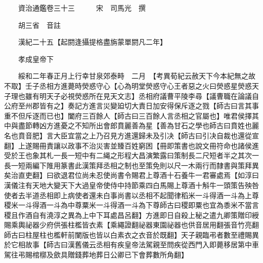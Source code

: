 










 


 
 


 

  
  
  
  
  





  
  
  
  
  
 
  

  

  
  
  



  

 
 

  
   




  

  
  


  　　資治通鑑卷三十三　　　宋　司馬光　撰

　　胡三省　音註

　　漢紀二十五【起閼逢攝提格盡旃蒙單閼凡二年】

　　孝成皇帝下

　　綏和二年春正月上行幸甘泉郊泰畤　二月　【考異荀紀云赦天下今本紀無之故不取】壬子丞相方進薨時熒惑守心【心為明堂熒惑守心王者惡之火曰熒惑星熒惑天子理也雖有明天子必視熒惑所在見天文志】丞相府議曹平陵李尋【議曹職在論議自公府至州郡皆有之】奏記方進言災變廹切大責日加安得保斥逐之戮【師古曰言其事重不但斥逐而已也】闔府三百餘人【師古曰三百餘人言丞相之官屬也】唯君侯擇其中與盡節轉凶方進憂之不知所出會郎賁麗善為星【善為甘石之學也師古曰賁姓也麗名也賁音肥】言大臣宜當之上乃召見方進還歸未及引决【師古曰引决自裁也還從宣翻】上遂賜冊責讓以政事不治災害並臻百姓窮困【冊即策書也說文冊符命也諸侯進受於王也象其札一長一短中有二䋲之形程大昌演繁露曰策制長二尺短者半之其次一長一短兩編下陮用篆書此漢策拜丞相之制也至策免則以尺一木兩行而隸書與策拜異矣治直吏翻】曰欲退君位尚未忍使尚書令賜君上尊酒十石養牛一君審處焉【如淳曰漢儀注有天地大變天下大過皇帝使侍中持節乘四白馬賜上尊酒十斛牛一頭策告殃咎使者去半道丞相即上病使者還未白事尚書以丞相不起聞律稻米一斗得酒一斗為上尊稷米一斗得酒一斗為中尊粟米一斗得酒一斗為下尊師古曰稷即粟也宜為黍米不當言稷且作酒自有澆淳之異為上中下耳處昌呂翻】方進即日自殺上秘之遣九卿策贈印綬賜乘輿祕器少府供張柱檻皆衣素【乘繩證翻祕器東園祕器也供音居用翻張音竹亮翻師古曰柱屋柱也檻軒前闌版也皆以白素衣之衣音於既翻】天子親臨弔者數至禮賜異於它相故事【師古曰漢舊儀云丞相有疾皇帝法駕親至問疾從西門入即薨移居第中車駕往弔賜棺槨及歛具贈錢葬地葬日公卿已下會葬數所角翻】

